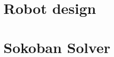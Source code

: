 \documentclass[a4paper]{article}
\begin{document}
\thispagestyle{empty}

\newpage

\tableofcontents
\newpage

\section{Robot design}%
\label{sec:robot_design}





\section{Sokoban Solver}%
\label{sec:sokoban_solver}

\end{document}
